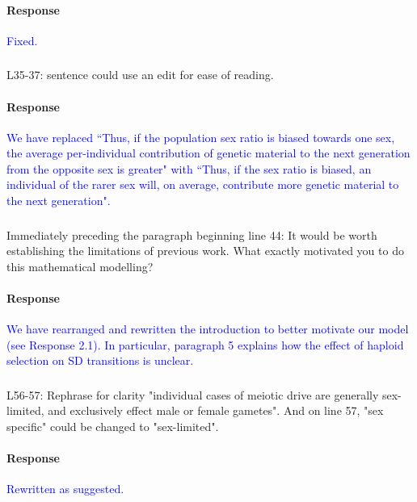 \documentclass[10pt,letterpaper]{article}
\begin{document}
\noindent\paragraph{Response}
\textcolor{blue}{Fixed.}

\noindent\subsubsection{}
L35-37: sentence could use an edit for ease of reading.

\noindent\paragraph{Response}
\textcolor{blue}{We have replaced ``Thus, if the population sex ratio is biased towards one sex, the average per-individual contribution of genetic material to the next generation from the opposite sex is greater" with ``Thus, if the sex ratio is biased, an individual of the rarer sex will, on average, contribute more genetic material to the next generation".}

\noindent\subsubsection{}
Immediately preceding the paragraph beginning line 44: It would be worth establishing the limitations of previous work. What exactly motivated you to do this mathematical modelling?

\noindent\paragraph{Response}
\textcolor{blue}{We have rearranged and rewritten the introduction to better motivate our model (see Response 2.1). In particular, paragraph 5 explains how the effect of haploid selection on SD transitions is unclear.}

\noindent\subsubsection{}
L56-57: Rephrase for clarity "individual cases of meiotic drive are generally sex-limited, and exclusively effect male or female gametes". And on line 57, "sex specific" could be changed to "sex-limited".

\noindent\paragraph{Response}
\textcolor{blue}{Rewritten as suggested.}
\end{document}
